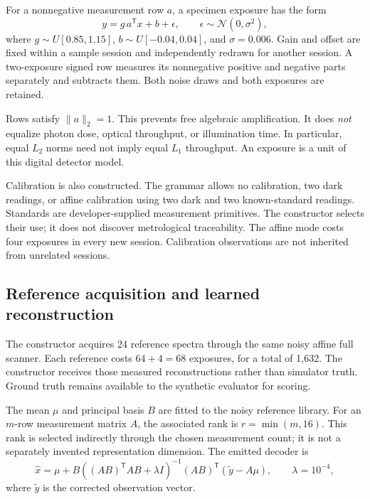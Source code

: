 \documentclass[11pt,a4paper]{article}
\begin{document}
For a nonnegative measurement row \(a\), a specimen exposure has the form
\begin{equation}
y=g\,a^\mathsf Tx+b+\epsilon,
\qquad
\epsilon\sim\mathcal N(0,\sigma^2),
\label{eq:measurement}
\end{equation}
where \(g\sim U[0.85,1.15]\), \(b\sim U[-0.04,0.04]\), and \(\sigma=0.006\). Gain and offset are fixed within a sample session and independently redrawn for another session. A two-exposure signed row measures its nonnegative positive and negative parts separately and subtracts them. Both noise draws and both exposures are retained.

Rows satisfy \(\|a\|_2=1\). This prevents free algebraic amplification. It does \emph{not} equalize photon dose, optical throughput, or illumination time. In particular, equal \(L_2\) norms need not imply equal \(L_1\) throughput. An exposure is a unit of this digital detector model.

Calibration is also constructed. The grammar allows no calibration, two dark readings, or affine calibration using two dark and two known-standard readings. Standards are developer-supplied measurement primitives. The constructor selects their use; it does not discover metrological traceability. The affine mode costs four exposures in every new session. Calibration observations are not inherited from unrelated sessions.

\subsection{Reference acquisition and learned reconstruction}

The constructor acquires 24 reference spectra through the same noisy affine full scanner. Each reference costs \(64+4=68\) exposures, for a total of 1,632. The constructor receives those measured reconstructions rather than simulator truth. Ground truth remains available to the synthetic evaluator for scoring.

The mean \(\mu\) and principal basis \(B\) are fitted to the noisy reference library. For an \(m\)-row measurement matrix \(A\), the associated rank is \(r=\min(m,16)\). This rank is selected indirectly through the chosen measurement count; it is not a separately invented representation dimension. The emitted decoder is
\begin{equation}
\hat x=\mu+B\left((AB)^\mathsf T AB+\lambda I\right)^{-1}
(AB)^\mathsf T\left(\tilde y-A\mu\right),
\qquad \lambda=10^{-4},
\label{eq:decoder}
\end{equation}
where \(\tilde y\) is the corrected observation vector.
\end{document}
